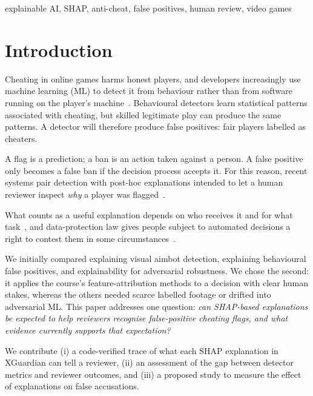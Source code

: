\documentclass[conference]{IEEEtran}
\begin{document}
\begin{IEEEkeywords}
explainable AI, SHAP, anti-cheat, false positives, human review, video games
\end{IEEEkeywords}

\section{Introduction}

Cheating in online games harms honest players, and developers increasingly use machine learning (ML) to detect it from behaviour rather than from software running on the player's machine~\cite{zhang2026xguardian, sousa2025minecraft}. Behavioural detectors learn statistical patterns associated with cheating, but skilled legitimate play can produce the same patterns. A detector will therefore produce false positives: fair players labelled as cheaters.

A flag is a prediction; a ban is an action taken against a person. A false positive only becomes a false ban if the decision process accepts it. For this reason, recent systems pair detection with post-hoc explanations intended to let a human reviewer inspect \emph{why} a player was flagged~\cite{zhang2026xguardian}. 

What counts as a useful explanation depends on who receives it and for what task~\cite{doshivelez2017rigorous}, and data-protection law gives people subject to automated decisions a right to contest them in some circumstances~\cite{gdpr2016}.

We initially compared explaining visual aimbot detection, explaining behavioural false positives, and explainability for adversarial robustness. We chose the second: it applies the course's feature-attribution methods to a decision with clear human stakes, whereas the others needed scarce labelled footage or drifted into adversarial ML. This paper addresses one question: \emph{can SHAP-based explanations be expected to help reviewers recognise false-positive cheating flags, and what evidence currently supports that expectation?}

We contribute (i) a code-verified trace of what each SHAP explanation in XGuardian can tell a reviewer, (ii) an assessment of the gap between detector metrics and reviewer outcomes, and (iii) a proposed study to measure the effect of explanations on false accusations.

\end{document}
